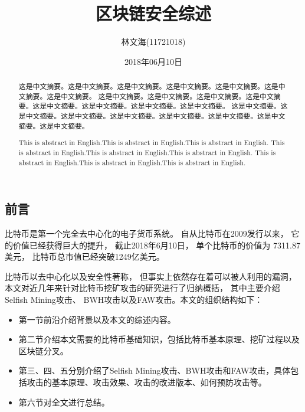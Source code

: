 \documentclass[a4paper, 11pt]{article}
\title{区块链安全综述}
\author{林文海(11721018)}
\date{2018年06月10日}
\begin{document}
    \setlength\parindent{2em}

        \renewcommand{\contentsname}{目录}  %
        \renewcommand{\abstractname}{摘要}  %
        \renewcommand{\refname}{参考文献}   %
        \renewcommand{\indexname}{索引}
        \renewcommand{\figurename}{图}
        \renewcommand{\tablename}{表}
        \renewcommand{\appendixname}{附录}
    
    \begin{CJK*}{UTF8}{gbsn}

    \maketitle
    
    \begin{abstract}
        这是中文摘要。这是中文摘要。这是中文摘要。这是中文摘要。这是中文摘要。这是中文摘要。这是中文摘要。
        这是中文摘要。这是中文摘要。这是中文摘要。这是中文摘要。这是中文摘要。这是中文摘要。这是中文摘要。这是中文摘要。
        这是中文摘要。这是中文摘要。这是中文摘要。这是中文摘要。这是中文摘要。这是中文摘要。这是中文摘要。这是中文摘要。
    \end{abstract}

    \renewcommand{\abstractname}{Abstract}

    \begin{abstract}
        This is abstract in English.This is abstract in English.This is abstract in English.
        This is abstract in English.This is abstract in English.This is abstract in English.
        This is abstract in English.This is abstract in English.This is abstract in English.
    \end{abstract}

    \section{前言}

    \indent

    比特币\cite{ref_article1}是第一个完全去中心化的电子货币系统。
    自从比特币在2009发行以来，
    它的价值已经获得巨大的提升，
    截止2018年6月10日，
    单个比特币的价值为
    7311.87美元，
    比特币总市值已经突破1249亿美元\cite{ref_web1}。


    比特币以去中心化以及安全性著称，
    但事实上依然存在着可以被人利用的漏洞，
    本文对近几年来针对比特币挖矿攻击的研究进行了归纳概括，
    其中主要介绍Selfish Mining攻击\cite{ref_selfish_mining1, ref_selfish_mining2, ref_selfish_mining3}、
    BWH攻击\cite{ref_BWH1, ref_BWH2, ref_article3}以及FAW攻击\cite{ref_FAW}。本文的组织结构如下：
    \begin{itemize}
        \item 第一节前沿介绍背景以及本文的综述内容。
        \item 第二节介绍本文需要的比特币基础知识，包括比特币基本原理、挖矿过程以及区块链分叉。
        \item 第三、四、五分别介绍了Selfish Mining攻击、BWH攻击和FAW攻击，具体包括攻击的基本原理、攻击效果、攻击的改进版本、如何预防攻击等。
        \item 第六节对全文进行总结。


\end{itemize}
\end{CJK*}
\end{document}
